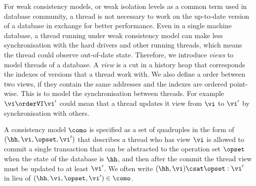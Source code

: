 For weak consistency models, or weak isolation levels as a common term used in database community, a thread is not necessary to work on the up-to-date version of a database in exchange for better performance. 
Even in a single machine database, a thread running under weak consistency model can make less synchronisation with the hard drivers and other running threads, which means the thread could observe out-of-date state.
Therefore, we introduce \emph{views} to model threads of a database.
A \emph{view} is a cut in a history heap that corresponds the indexes of versions that a thread work with.
We also define a order between two views, if they contain the same addresses and the indexes are ordered point-wise.
This is to model the synchronisation between threads.
For example \( \vi \orderVI \vi' \) could mean that a thread updates it view from \( \vi \) to \( \vi' \) by synchronisation with others.


A consistency model \( \como \) is specified as a set of quadruples in the form of \( ( \hh, \vi, \opset, \vi' ) \) that describes a thread who has view \( \vi \) is allowed to commit a single transaction that can be abstracted to the operation set \( \opset \) when the state of the database is \( \hh \), and then after the commit the thread view must be updated to at least \( \vi' \).
We often write \( (\hh, \vi) \csat \opset : \vi' \) in lieu of \( (\hh, \vi, \opset, \vi') \in \como \).


